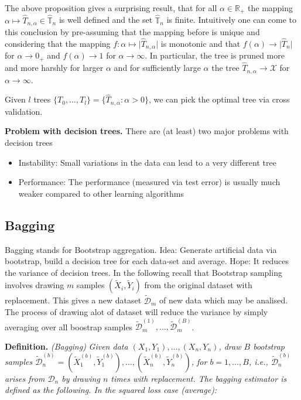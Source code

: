 \documentclass[a4paper,12pt,openany]{book}
\providecommand{\tightlist}{%
 \setlength{\itemsep}{0pt}\setlength{\parskip}{0pt}}
\begin{document}
The above proposition gives a surprising result, that for all \(\alpha\in \mathbb R_+\) the mapping \(\alpha \mapsto\hat T_{n,\alpha}\in\hat{ \mathbb T}_n\) is well defined and the set \(\hat{ \mathbb T}_n\) is finite. Intuitively one can come to this conclusion by pre-assuming that the mapping before is unique and considering that the mapping \(f : \alpha \mapsto \vert \hat T_{n,\alpha}\vert\) is monotonic and that \(f(\alpha)\to \vert \hat T_n\vert\) for \(\alpha \to 0_+\) and \(f(\alpha)\to 1\) for \(\alpha \to \infty\). In particular, the tree is pruned more and more harshly for larger \(\alpha\) and for sufficiently large \(\alpha\) the tree \(\hat T_{n,\alpha}\to\mathcal X\) for \(\alpha \to \infty\).

Given \(l\) trees \(\{T_0,\dots, T_l\}=\{\hat T_{n,\alpha} : \alpha>0\}\), we can pick the optimal tree via cross validation.

\textbf{Problem with decision trees.} There are (at least) two major problems with decision trees

\begin{itemize}
\tightlist
\item
  Instability: Small variations in the data can lead to a very different tree
\item
  Performance: The performance (measured via test error) is usually much weaker compared to other learning algorithms
\end{itemize}

\hypertarget{bagging}{%
\subsection{Bagging}\label{bagging}}

Bagging stands for Bootstrap aggregation. Idea: Generate artificial data via bootstrap, build a decision tree for each data-set and average. Hope: It reduces the variance of decision trees. In the following recall that Bootstrap sampling involves drawing \(m\) samples \((\tilde X_i,\tilde Y_i)\) from the original dataset with replacement. This gives a new dataset \(\tilde {\mathcal D}_m\) of new data which may be analised. The process of drawing alot of dataset will reduce the variance by simply averaging over all boostrap samples \(\tilde {\mathcal D}_m^{(1)},...,\tilde {\mathcal D}_m^{(B)}\).

\textbf{Definition.} \emph{(Bagging)} \emph{Given data \({(X_1,Y_1),\dots, (X_n,Y_n)}\), draw \(B\) bootstrap samples \(\tilde {\mathcal D}^{(b)}_n={(\tilde X^{(b)}_1,\tilde Y^{(b)}_1),\dots, (\tilde X^{(b)}_n,\tilde Y^{(b)}_n)}\), for \(b=1,\dots, B\), i.e., \(\tilde {\mathcal D}^{(b)}_n\) arises from \(\mathcal D_n\) by drawing \(n\) times with replacement. The bagging estimator is defined as the following. In the squared loss case (average):}
\end{document}

